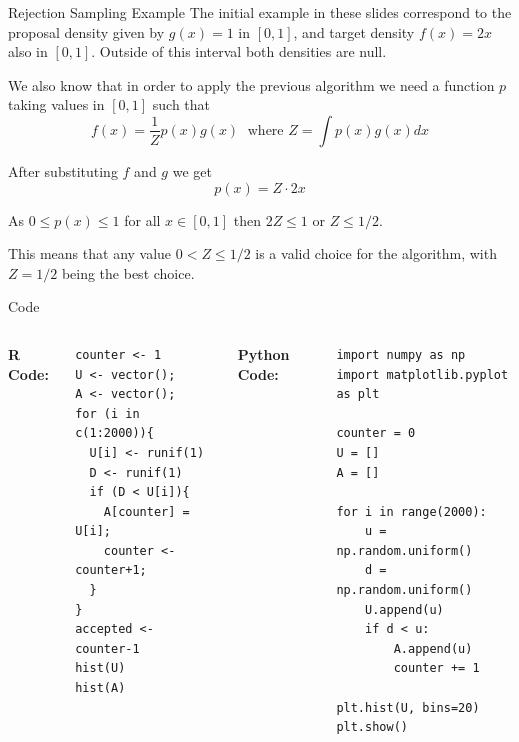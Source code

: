 \documentclass[8pt]{beamer}
\begin{document}
\begin{frame}{Rejection Sampling Example}
The initial example in these slides correspond to the proposal density given by $g(x)=1$ in $[0,1]$, and target density $f(x)=2x$ also in $[0,1]$. Outside of this interval both densities are null.

\vspace{2mm} 

We also know that in order to apply the previous algorithm we need a function $p$ taking values in $[0,1]$ such that 
\begin{equation*}
f(x)=\frac{1}{Z}p(x)g(x)  \; \text{ where } Z=\int p(x) g(x) dx
\end{equation*}

After substituting $f$ and $g$ we get
\begin{equation*}
p(x)=Z\cdot2x
\end{equation*}

As $0\leq p(x) \leq 1$ for all $x \in [0,1]$ then $2Z \leq 1$ or $Z \leq 1/2$.

\vspace{2mm}

This means that any value $0<Z\leq 1/2$ is a valid choice for the algorithm, with $Z=1/2$ being the best choice.
\end{frame}


\begin{frame}[fragile]
\alert{Code}

\vspace{2mm}

\begin{columns}
{\bf R Code:}
\begin{lstlisting}
counter <- 1
U <- vector();
A <- vector();
for (i in c(1:2000)){ 
  U[i] <- runif(1)
  D <- runif(1)
  if (D < U[i]){
    A[counter] = U[i];
    counter <- counter+1;
  }
}
accepted <- counter-1
hist(U)
hist(A)
\end{lstlisting}

{\bf Python Code:}
\begin{lstlisting}
import numpy as np
import matplotlib.pyplot as plt

counter = 0
U = []
A = []

for i in range(2000):
    u = np.random.uniform()
    d = np.random.uniform()
    U.append(u)
    if d < u:
        A.append(u)
        counter += 1

plt.hist(U, bins=20)
plt.show()

\end{lstlisting}
\end{columns}
\end{frame}
\end{document}

